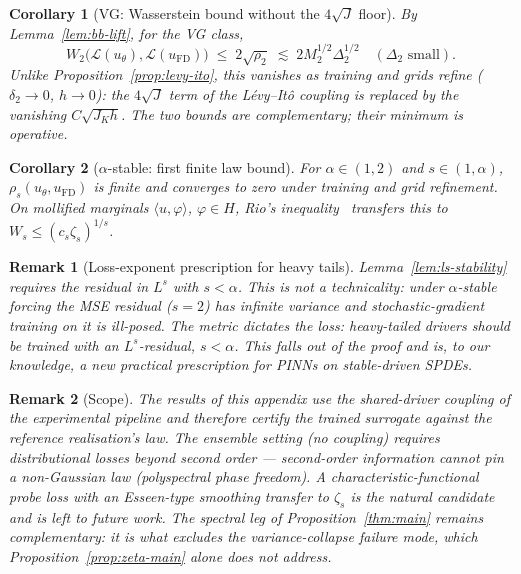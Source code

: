 \documentclass[review,12pt]{elsarticle}
\newtheorem{remark}{Remark}
\newtheorem{corollary}{Corollary}
\begin{document}
\begin{corollary}[VG: Wasserstein bound without the $4\sqrt J$
floor]\label{cor:vg-floorfree}
By Lemma~\ref{lem:bb-lift}, for the VG class,
\[
W_2\bigl(\mathcal L(u_\theta), \mathcal L(u_{\mathrm{FD}})\bigr)
\;\le\; 2\sqrt{\rho_2}
\;\lesssim\; 2 M_2^{1/2} \Delta_2^{1/2}
\quad (\Delta_2 \text{ small}).
\]
Unlike Proposition~\ref{prop:levy-ito}, this vanishes as training and
grids refine ($\delta_2 \to 0$, $h \to 0$): the $4\sqrt J$ term of
the L\'evy--It\^o coupling is replaced by the vanishing
$C\sqrt{J_K h}$. The two bounds are complementary; their minimum is
operative.
\end{corollary}

\begin{corollary}[$\alpha$-stable: first finite law bound]
\label{cor:stable}
For $\alpha \in (1, 2)$ and $s \in (1, \alpha)$,
$\rho_s(u_\theta, u_{\mathrm{FD}})$ is finite and converges to zero
under training and grid refinement. On mollified marginals
$\langle u, \varphi\rangle$, $\varphi \in H$, Rio's
inequality~\cite{Rio2009} transfers this to
$W_s \le (c_s \zeta_s)^{1/s}$.
\end{corollary}

\begin{remark}[Loss-exponent prescription for heavy tails]
\label{rem:loss-exponent}
Lemma~\ref{lem:ls-stability} requires the residual in $L^s$ with
$s < \alpha$. This is not a technicality: under $\alpha$-stable
forcing the MSE residual ($s = 2$) has infinite variance and
stochastic-gradient training on it is ill-posed. The metric dictates
the loss: heavy-tailed drivers should be trained with an
$L^s$-residual, $s < \alpha$. This falls out of the proof and is, to
our knowledge, a new practical prescription for PINNs on
stable-driven SPDEs.
\end{remark}

\begin{remark}[Scope]\label{rem:zeta-scope}
The results of this appendix use the shared-driver coupling of the
experimental pipeline and therefore certify the trained surrogate
against the reference realisation's law. The ensemble setting (no
coupling) requires distributional losses beyond second order —
second-order information cannot pin a non-Gaussian law (polyspectral
phase freedom). A characteristic-functional probe loss with an
Esseen-type smoothing transfer to $\zeta_s$ is the natural candidate
and is left to future work. The spectral leg of
Proposition~\ref{thm:main} remains complementary: it is what excludes
the variance-collapse failure mode, which
Proposition~\ref{prop:zeta-main} alone does not address.
\end{remark}
\end{document}
